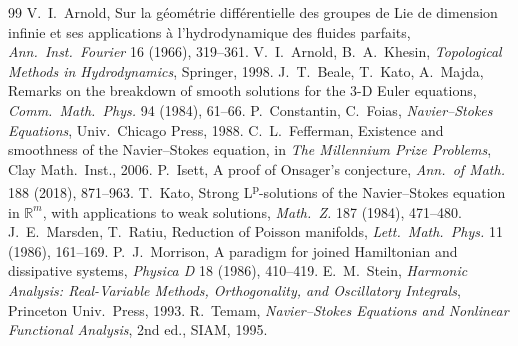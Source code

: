 \documentclass[11pt,a4paper]{article}
\theoremstyle{plain}
\theoremstyle{definition}
\theoremstyle{remark}
\begin{document}
\begin{thebibliography}{99}
 V.~I.~Arnold, Sur la g\'eom\'etrie diff\'erentielle des groupes de Lie de dimension infinie et ses applications \`a l'hydrodynamique des fluides parfaits, \emph{Ann.\ Inst.\ Fourier} 16 (1966), 319--361.
 V.~I.~Arnold, B.~A.~Khesin, \emph{Topological Methods in Hydrodynamics}, Springer, 1998.
 J.~T.~Beale, T.~Kato, A.~Majda, Remarks on the breakdown of smooth solutions for the 3-D Euler equations, \emph{Comm.\ Math.\ Phys.} 94 (1984), 61--66.
 P.~Constantin, C.~Foias, \emph{Navier--Stokes Equations}, Univ.\ Chicago Press, 1988.
 C.~L.~Fefferman, Existence and smoothness of the Navier--Stokes equation, in \emph{The Millennium Prize Problems}, Clay Math.\ Inst., 2006.
 P.~Isett, A proof of Onsager's conjecture, \emph{Ann.\ of Math.} 188 (2018), 871--963.
 T.~Kato, Strong L\textsuperscript{p}-solutions of the Navier--Stokes equation in \ensuremath{\mathbb R^m}, with applications to weak solutions, \emph{Math.\ Z.} 187 (1984), 471--480.
 J.~E.~Marsden, T.~Ratiu, Reduction of Poisson manifolds, \emph{Lett.\ Math.\ Phys.} 11 (1986), 161--169.
 P.~J.~Morrison, A paradigm for joined Hamiltonian and dissipative systems, \emph{Physica D} 18 (1986), 410--419.
 E.~M.~Stein, \emph{Harmonic Analysis: Real-Variable Methods, Orthogonality, and Oscillatory Integrals}, Princeton Univ.\ Press, 1993.
 R.~Temam, \emph{Navier--Stokes Equations and Nonlinear Functional Analysis}, 2nd ed., SIAM, 1995.
\end{thebibliography}
\end{document}
